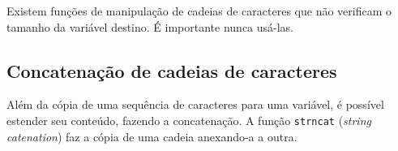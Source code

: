 \documentclass[
  11pt,
  a4paper,
]{scrbook}
\begin{document}
\begin{tcolorbox}[enhanced jigsaw, arc=.35mm, bottomtitle=1mm, colbacktitle=quarto-callout-tip-color!10!white, title=\textcolor{quarto-callout-tip-color}{\faLightbulb}\hspace{0.5em}{Dica}, toprule=.15mm, left=2mm, opacityback=0, colback=white, colframe=quarto-callout-tip-color-frame, opacitybacktitle=0.6, bottomrule=.15mm, leftrule=.75mm, toptitle=1mm, coltitle=black, titlerule=0mm, rightrule=.15mm, breakable]

Existem funções de manipulação de cadeias de caracteres que não
verificam o tamanho da variável destino. É importante nunca usá-las.

\end{tcolorbox}

\subsection{Concatenação de cadeias de
caracteres}\label{concatenauxe7uxe3o-de-cadeias-de-caracteres}

Além da cópia de uma sequência de caracteres para uma variável, é
possível estender seu conteúdo, fazendo a concatenação. A função
\texttt{strncat} (\emph{string catenation}) faz a cópia de uma cadeia
anexando-a a outra.
\end{document}
